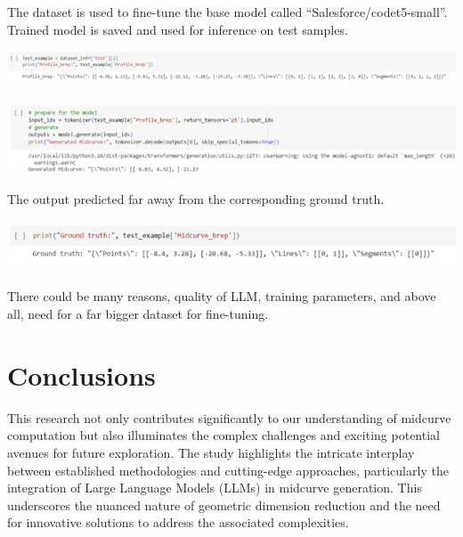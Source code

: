 \documentclass[conference]{IEEEtran}
\begin{document}
The dataset is used to fine-tune the base model called ``Salesforce/codet5-small''. Trained model is saved and used for inference on test samples.

         \begin{center}
	\includegraphics[width=\linewidth]{images/kaggle3}
	\label{fig_k3}
    \end{center}
    
         \begin{center}
	\includegraphics[width=\linewidth]{images/kaggle4}
	\label{fig_k4}
    \end{center}    
    
The output predicted far away from the corresponding ground truth. 

         \begin{center}
	\includegraphics[width=\linewidth]{images/kaggle5}
	\label{fig_k5}
    \end{center}
    
There could be many reasons, quality of LLM, training parameters, and above all, need for a far bigger dataset for fine-tuning.


\section{Conclusions}
\label{sec:5}

This research not only contributes significantly to our understanding of midcurve computation but also illuminates the complex challenges and exciting potential avenues for future exploration. The study highlights the intricate interplay between established methodologies and cutting-edge approaches, particularly the integration of Large Language Models (LLMs) in midcurve generation. This underscores the nuanced nature of geometric dimension reduction and the need for innovative solutions to address the associated complexities.
\end{document}
